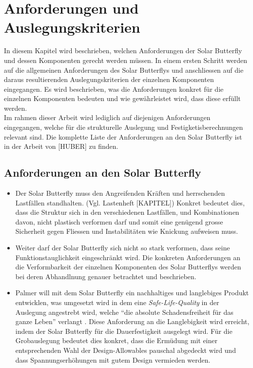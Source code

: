 \section{Anforderungen und Auslegungskriterien}
In diesem Kapitel wird beschrieben, welchen Anforderungen der Solar Butterfly und dessen Komponenten gerecht werden müssen. In einem ersten Schritt werden auf die allgemeinen Anforderungen des Solar Butterflys und anschliessen auf die daraus resultierenden Auslegungskriterien der einzelnen Komponenten eingegangen. Es wird beschrieben, was die Anforderungen konkret für die einzelnen Komponenten bedeuten und wie gewährleistet wird, dass diese erfüllt werden.\\
Im rahmen dieser Arbeit wird lediglich auf diejenigen Anforderungen eingegangen, welche für die strukturelle Auslegung und Festigketisberechnungen relevant sind. Die komplette Liste der Anforderungen an den Solar Butterfly ist in der Arbeit von [HUBER] zu finden.

\subsection{Anforderungen an den Solar Butterfly}
\begin{itemize}
  \item Der Solar Butterfly muss den Angreifenden Kräften und herrschenden Lastfällen standhalten. (Vgl. Lastenheft [KAPITEL]) Konkret bedeutet dies, dass die Struktur sich in den verschiedenen Lastfällen, und Kombinationen davon, nicht plastisch verformen darf und somit eine genügend grosse Sicherheit gegen Fliessen und Instabilitäten wie Knickung aufweisen muss.\\
  \item Weiter darf der Solar Butterfly sich nicht so stark verformen, dass seine Funktionstauglichkeit eingeschränkt wird. Die konkreten Anforderungen an die Verformbarkeit der einzelnen Komponenten des Solar Butterflys werden bei deren Abhandlnung genauer betrachtet und beschrieben.\\
  \item Palmer will mit dem Solar Butterfly ein nachhaltiges und langlebiges Produkt entwicklen, was umgesetzt wird in dem eine \emph{Safe-Life-Quality} in der Auslegung angestrebt wird, welche ``die absolute Schadensfreiheit für das ganze Leben'' verlangt \cite{klein}. Diese Anforderung an die Langlebigkeit wird erreicht, indem der Solar Butterfly für die Dauerfestigkeit ausgelegt wird. Für die Grobauslegung bedeutet dies konkret, dass die Ermüdung mit einer entsprechenden Wahl der Design-Allowables pauschal abgedeckt wird und dass Spannungserhöhungen mit gutem Design vermieden werden.
\end{itemize}

